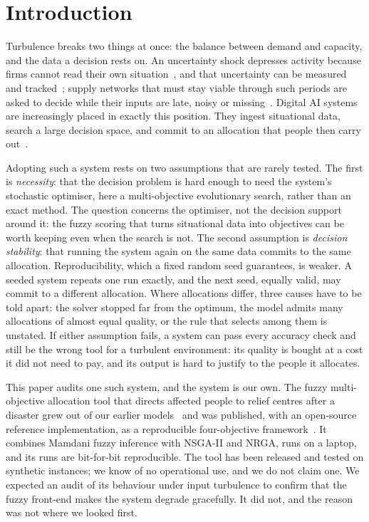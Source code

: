 \documentclass[systems,article,submit,moreauthors,pdftex]{Definitions/mdpi}
\begin{document}
\section{Introduction}\label{sec:intro}

Turbulence breaks two things at once: the balance between demand and capacity, and the
data a decision rests on. An uncertainty shock depresses activity because firms cannot
read their own situation~\cite{bloom2009uncertainty}, and that uncertainty can be measured
and tracked~\cite{baker2016epu}; supply networks that must stay viable through such
periods are asked to decide while their inputs are late, noisy or missing~\cite{ivanov2020viability,ivanov2020covid}.
Digital AI systems are increasingly placed in exactly this position. They ingest
situational data, search a large decision space, and commit to an allocation that people
then carry out~\cite{modgil2022ai,belhadi2024ai,pan2025aiusage}.

Adopting such a system rests on two assumptions that are rarely tested. The first is
\emph{necessity}: that the decision problem is hard enough to need the system's stochastic
optimiser, here a multi-objective evolutionary search, rather than an exact method. The
question concerns the optimiser, not the decision support around it: the fuzzy scoring that
turns situational data into objectives can be worth keeping even when the search is not. The
second assumption is \emph{decision stability}: that running the system again on the same
data commits to the same allocation. Reproducibility, which a fixed random seed guarantees,
is weaker. A seeded system repeats one run exactly, and the next seed, equally valid, may
commit to a different allocation. Where allocations differ, three causes have to be told
apart: the solver stopped far from the optimum, the model admits many allocations of almost
equal quality, or the rule that selects among them is unstated. If either assumption fails, a
system can pass every accuracy check and still be the wrong tool for a turbulent environment:
its quality is bought at a cost it did not need to pay, and its output is hard to justify to
the people it allocates.

This paper audits one such system, and the system is our own. The fuzzy multi-objective
allocation tool that directs affected people to relief centres after a disaster grew out of
our earlier models~\cite{rabiei2021vehicle,rabiei2023volunteer} and was published, with an
open-source reference implementation, as a reproducible four-objective
framework~\cite{rabiei2026resilient}. It combines Mamdani fuzzy inference with NSGA-II and
NRGA, runs on a laptop, and its runs are bit-for-bit reproducible. The tool has been released
and tested on synthetic instances; we know of no operational use, and we do not claim one. We
expected an audit of its behaviour under input turbulence to confirm that the fuzzy front-end
makes the system degrade gracefully. It did not, and the reason was not where we looked first.
\end{document}
